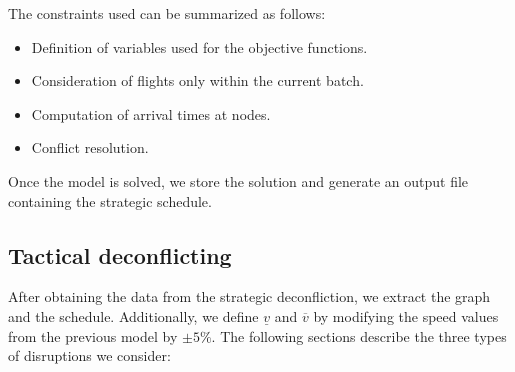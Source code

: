 \documentclass[../../thesis.tex]{subfiles}
\begin{document}
The constraints used can be summarized as follows:  
\begin{itemize}
    \item Definition of variables used for the objective functions.  
    \item Consideration of flights only within the current batch.  
    \item Computation of arrival times at nodes.  
    \item Conflict resolution.  
\end{itemize}

Once the model is solved, we store the solution and generate an output file containing the strategic schedule.  

\subsection{Tactical deconflicting}
After obtaining the data from the strategic deconfliction, we extract the graph and the schedule. Additionally, we define $\underline v$ and $\overline v$ by modifying the speed values from the previous model by $\pm 5\%$.
\newline
The following sections describe the three types of disruptions we consider:
\end{document}

